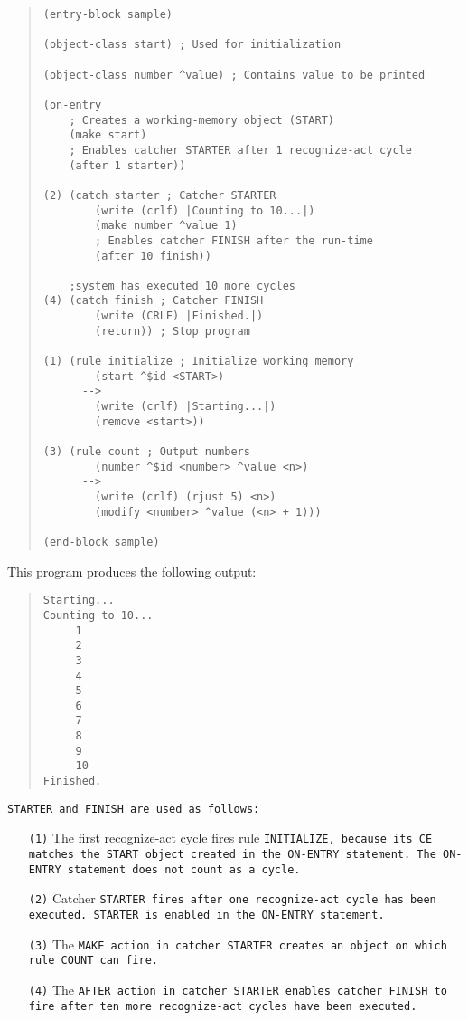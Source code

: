 \begin{quote}
\begin{verbatim}
(entry-block sample)

(object-class start) ; Used for initialization

(object-class number ^value) ; Contains value to be printed

(on-entry
    ; Creates a working-memory object (START)
    (make start)
    ; Enables catcher STARTER after 1 recognize-act cycle
    (after 1 starter))

(2) (catch starter ; Catcher STARTER
        (write (crlf) |Counting to 10...|)
        (make number ^value 1)
        ; Enables catcher FINISH after the run-time
        (after 10 finish))

    ;system has executed 10 more cycles
(4) (catch finish ; Catcher FINISH
        (write (CRLF) |Finished.|)
        (return)) ; Stop program

(1) (rule initialize ; Initialize working memory
        (start ^$id <START>)
      -->
        (write (crlf) |Starting...|)
        (remove <start>))

(3) (rule count ; Output numbers
        (number ^$id <number> ^value <n>)
      -->
        (write (crlf) (rjust 5) <n>)
        (modify <number> ^value (<n> + 1)))

(end-block sample)
\end{verbatim}
\end{quote}

This program produces the following output:

\begin{quote}
\begin{verbatim}
Starting...
Counting to 10...
     1
     2
     3
     4
     5
     6
     7
     8
     9
     10
Finished.
\end{verbatim}
\end{quote}

\tt{STARTER} and \tt{FINISH} are used as follows:
\begin{itemize}
\item[\tt{(1)}] The first recognize-act cycle fires rule
  \tt{INITIALIZE}, because its CE matches the \tt{START} object
  created in the \tt{ON-ENTRY} statement. The \tt{ON-ENTRY} statement
  does not count as a cycle.

\item[\tt{(2)}] Catcher \tt{STARTER} fires after one recognize-act
  cycle has been executed. \tt{STARTER} is enabled in the
  \tt{ON-ENTRY} statement.

\item[\tt{(3)}] The \tt{MAKE} action in catcher \tt{STARTER} creates
  an object on which rule \tt{COUNT} can fire.

\item[\tt{(4)}] The \tt{AFTER} action in catcher \tt{STARTER} enables
  catcher \tt{FINISH} to fire after ten more recognize-act cycles have
  been executed.
\end{itemize}

